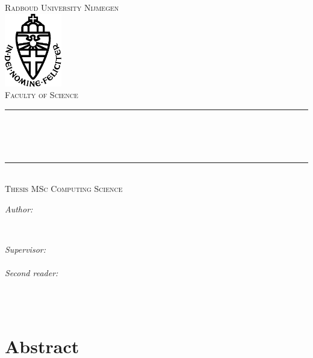\documentclass[12pt,twoside]{report}
\begin{document}
	\begin{titlepage}
		\thispagestyle{empty}
		\newcommand{\HRule}{\rule{\linewidth}{0.5mm}}
		\center
		\textsc{\Large Radboud University Nijmegen}\\[.7cm]
		\includegraphics[width=25mm]{img/in_dei_nomine_feliciter.eps}\\[.5cm]
		\textsc{Faculty of Science}\\[0.5cm]
		
		\HRule \\[0.4cm]
		{ \huge \bfseries \thesistitle}\\[0.1cm]
		\textsc{\thesissubtitle}\\
		\HRule \\[.5cm]
		\textsc{\large Thesis MSc Computing Science}\\[.5cm]
		
		\begin{minipage}{0.4\textwidth}
			\begin{flushleft} \large
				\emph{Author:}\\
				\thesisauthorfirst\space \textsc{\thesisauthorsecond}
			\end{flushleft}
		\end{minipage}
		~
		\begin{minipage}{0.4\textwidth}
			\begin{flushright} \large
				\emph{Supervisor:} \\
				\thesissupervisorfirst\space \textsc{\thesissupervisorsecond} \\[1em]
				\emph{Second reader:} \\
				\thesissecondreaderfirst\space \textsc{\thesissecondreadersecond}
			\end{flushright}
		\end{minipage}\\[4cm]
		\vfill
		{\large \thesisdate}\\
		\clearpage
	\end{titlepage}
	
	\tableofcontents
	
	\newpage
	
	\chapter*{Abstract}
	
	
\end{document}
